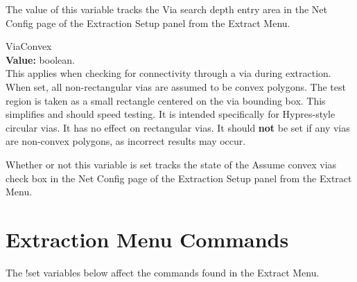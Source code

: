 \begin{description}
The value of this variable tracks the {\cb Via search depth} entry
area in the {\cb Net Config} page of the {\cb Extraction Setup} panel
from the {\cb Extract Menu}.

\item{\et ViaConvex}\\
{\bf Value:} boolean.\\
This applies when checking for connectivity through a via during
extraction.  When set, all non-rectangular vias are assumed to be
convex polygons.  The test region is taken as a small rectangle
centered on the via bounding box.  This simplifies and should speed
testing.  It is intended specifically for Hypres-style circular vias. 
It has no effect on rectangular vias.  It should {\bf not} be set if
any vias are non-convex polygons, as incorrect results may occur.

Whether or not this variable is set tracks the state of the {\cb
Assume convex vias} check box in the {\cb Net Config} page of the {\cb
Extraction Setup} panel from the {\cb Extract Menu}. 
\end{description}


\section{Extraction Menu Commands}

The {\cb !set} variables below affect the commands found in the
{\cb Extract Menu}.

